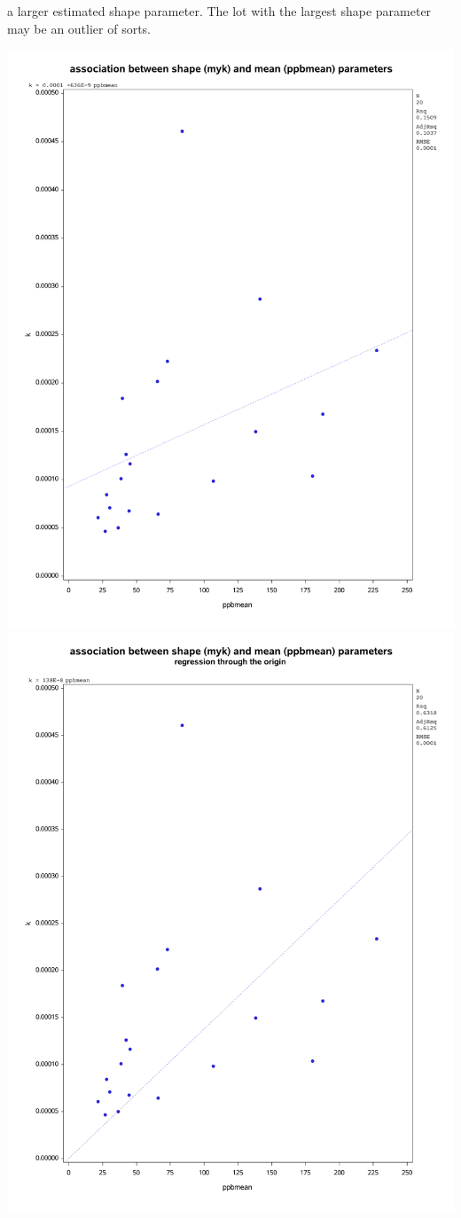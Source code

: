 \documentclass{article}
\begin{document}
a larger estimated shape parameter.  The lot with the largest shape parameter may be an outlier of sorts.
\begin{center}
\includegraphics[scale=.35]{k_linear_M.pdf}
\includegraphics[scale=.35]{k_linear_M_origin.pdf}

\end{center}
\end{document}
